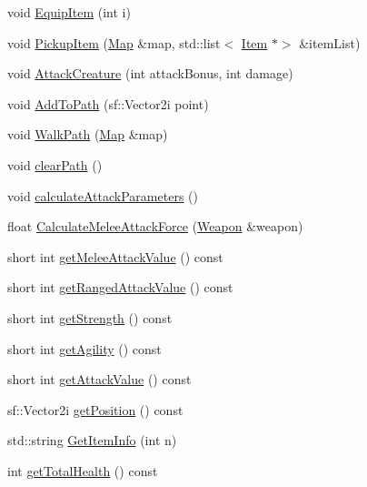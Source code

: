 \begin{DoxyCompactItemize}
void \mbox{\hyperlink{class_base_creature_a1e73375251b20070ae9dac505b280b3e}{Equip\+Item}} (int i)
\item 
void \mbox{\hyperlink{class_base_creature_a2d45724079ff2eeb6606b222e405e4a8}{Pickup\+Item}} (\mbox{\hyperlink{class_map}{Map}} \&map, std\+::list$<$ \mbox{\hyperlink{class_item}{Item}} $\ast$$>$ \&item\+List)
\item 
void \mbox{\hyperlink{class_base_creature_a63f43a7153eee3c1032b02f6d1948cdb}{Attack\+Creature}} (int attack\+Bonus, int damage)
\item 
void \mbox{\hyperlink{class_base_creature_aa18f395754df39095f993e6805ef37a8}{Add\+To\+Path}} (sf\+::\+Vector2i point)
\item 
void \mbox{\hyperlink{class_base_creature_aaecab78bf5a5a5293079634e813f854f}{Walk\+Path}} (\mbox{\hyperlink{class_map}{Map}} \&map)
\item 
void \mbox{\hyperlink{class_base_creature_a8c7fec43bb0ca9a15e0f2596960283b7}{clear\+Path}} ()
\item 
void \mbox{\hyperlink{class_base_creature_a389d8ae4c4caa2d7c55939bef70935a8}{calculate\+Attack\+Parameters}} ()
\item 
float \mbox{\hyperlink{class_base_creature_ac81e681e444ed860c212463025d04a1d}{Calculate\+Melee\+Attack\+Force}} (\mbox{\hyperlink{class_weapon}{Weapon}} \&weapon)
\item 
short int \mbox{\hyperlink{class_base_creature_a7b4f974b77953aea8f4c698e6e21c500}{get\+Melee\+Attack\+Value}} () const
\item 
short int \mbox{\hyperlink{class_base_creature_a58a174420d25df7d0865087586c66a21}{get\+Ranged\+Attack\+Value}} () const
\item 
short int \mbox{\hyperlink{class_base_creature_a1232a2ecb3199fe79627df912078f24e}{get\+Strength}} () const
\item 
short int \mbox{\hyperlink{class_base_creature_ac04efe1dda147e264998609635baadb6}{get\+Agility}} () const
\item 
short int \mbox{\hyperlink{class_base_creature_a4e3864bd12e271718a838ba6c3881f0a}{get\+Attack\+Value}} () const
\item 
sf\+::\+Vector2i \mbox{\hyperlink{class_base_creature_a00ebdc186dd6d3c0ef3c3d1262d4363f}{get\+Position}} () const
\item 
std\+::string \mbox{\hyperlink{class_base_creature_a19f380cccb11f31d10d00de934da1b7f}{Get\+Item\+Info}} (int n)
\item 
int \mbox{\hyperlink{class_base_creature_accab7a878eae0580476b282ce2c556d3}{get\+Total\+Health}} () const
$$
\end{DoxyCompactItemize}
